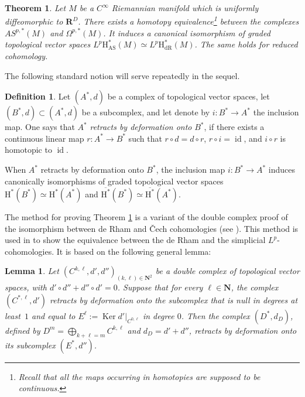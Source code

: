 \documentclass[JEP,XML,SOM,Unicode,published]{cedram}
\newcommand{\AS}{\mathrm{AS}}
\newcommand{\dR}{\mathrm{dR}}
\newcommand{\rH}{\mathrm{H}}
\newcommand{\NN}{\mathbf{N}}
\newcommand{\RR}{\mathbf{R}}
\theoremstyle{plain}
\newtheorem{theorem}[equation]{Theorem}
\newtheorem{lemma}[equation]{Lemma}
\theoremstyle{remark}
\theoremstyle{definition}
\newtheorem{definition}[equation]{Definition}
\DeclareMathOperator{\id}{id}
\DeclareMathOperator{\Ker}{Ker}
\begin{document}
\begin{theorem}
\label{appendix-theorem}
Let $M$ be a $C^\infty$ Riemannian manifold which is uniformly diffeomorphic to $\RR^D$.
There exists a homotopy equivalence\footnote{Recall that all the maps occurring in homotopies are supposed to be continuous.} between the
complexes $AS^{p, *}(M)$ and $\Omega^{p,*}(M)$.
It induces a canonical isomorphism of graded topological vector spaces $L^p \rH_\AS^*(M)
\simeq L^p \rH_\dR^*(M)$. The same holds for reduced cohomology.
\end{theorem}

The following standard notion will serve repeatedly in the sequel.

\begin{definition} Let $(A^*, d)$ be a complex of topological vector spaces, let $(B^*, d) \subset (A^*, d)$ be a subcomplex, and let denote
by $i: B^* \to A^*$ the inclusion map. One says that $A^*$ \textit{retracts by deformation onto} $B^*$, if there exists a continuous linear
map $r: A^* \to B^*$ such that $r \circ d = d \circ r$, $r \circ i = \id$, and $i \circ r$ is homotopic to $\id$.
\end{definition}

When $A^*$ retracts by deformation onto $B^*$, the inclusion map $i: B^* \to A^*$ induces canonically isomorphisms
of graded topological vector spaces
$\rH^*(B^*) \simeq \rH^*(A^*)$ and $\overline{\rH^*}(B^*) \simeq \overline{\rH^*}(A^*)$.

The method for proving Theorem \ref{appendix-theorem} is a variant of the double complex proof
of the isomorphism between de Rham and \v Cech cohomologies
(see \eg  \cite[Th.\,8.9 \& Prop.\,9.5]{BT82}). This method is used in \cite{Pa95} to show the equivalence between the
de Rham and the simplicial
$L^p$\nobreakdash-cohomologies. It is based on the following general lemma:

\begin{lemma}\label{appendix-lemma0}
Let $(C^{k, \ell}, d', d'')_{(k,\ell) \in \NN^2}$ be a double complex of topological vector spaces, with
$d'\circ d'' +d''\circ d' =0$. Suppose that for every $\ell \in \NN$,
the complex $(C^{*, \ell}, d')$ retracts by deformation onto the subcomplex that is null in degrees at least~$1$ and equal
to $E^\ell:= \Ker d'\vert_{C^{0,\ell}}$ in degree $0$. Then the complex $(D^*, d_D)$, defined
by $D^m = \bigoplus_{k + \ell = m} C^{k, \ell}$ and $d_D = d' + d''$, retracts by deformation onto its subcomplex $(E^*, d'')$.
\end{lemma}
\end{document}
